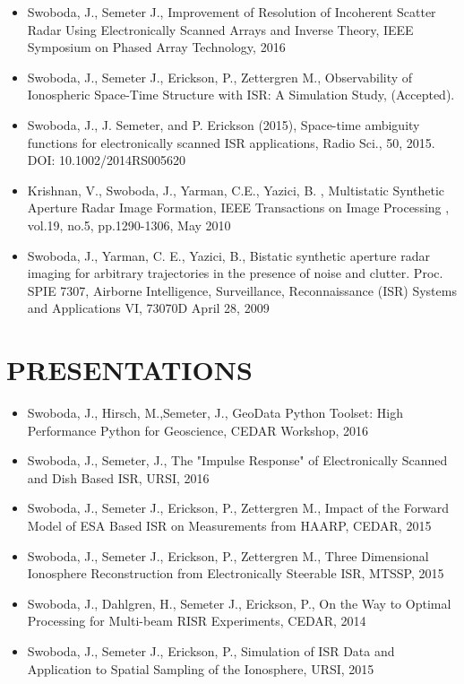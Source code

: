 \begin{itemize}
	\item Swoboda, J., Semeter J., Improvement of Resolution of Incoherent Scatter Radar Using Electronically Scanned Arrays and Inverse Theory, IEEE Symposium on Phased Array Technology, 2016
	\item Swoboda, J., Semeter J., Erickson, P., Zettergren M., Observability of Ionospheric Space-Time Structure with ISR:   A Simulation Study, (Accepted). 
	\item Swoboda, J., J. Semeter, and P. Erickson (2015), Space-time ambiguity functions for electronically scanned ISR applications, Radio Sci., 50, 2015. DOI: 10.1002/2014RS005620

	\item Krishnan, V., Swoboda, J., Yarman, C.E., Yazici, B. , Multistatic Synthetic Aperture Radar Image Formation, IEEE Transactions on Image Processing , vol.19, no.5, pp.1290-1306, May 2010
    \item  Swoboda, J., Yarman, C. E., Yazici, B., Bistatic synthetic aperture radar imaging for arbitrary trajectories in the presence of noise and clutter. Proc. SPIE 7307, Airborne Intelligence, Surveillance, Reconnaissance (ISR) Systems and Applications VI, 73070D April 28, 2009 
\end{itemize}
	
\section*{PRESENTATIONS}
\begin{itemize}
	\item Swoboda, J., Hirsch, M.,Semeter, J., GeoData Python Toolset: High Performance Python for Geoscience, CEDAR Workshop, 2016
    \item Swoboda, J.,  Semeter, J., The "Impulse Response" of Electronically Scanned and Dish Based ISR, URSI, 2016
    \item Swoboda, J., Semeter J., Erickson, P., Zettergren M., Impact of the Forward Model of ESA Based ISR on Measurements from HAARP, CEDAR, 2015
	\item Swoboda, J., Semeter J., Erickson, P., Zettergren M., Three Dimensional Ionosphere Reconstruction from Electronically Steerable ISR, MTSSP, 2015
	\item Swoboda, J., Dahlgren, H., Semeter J., Erickson, P., On the Way to Optimal Processing for Multi-beam RISR Experiments, CEDAR, 2014
    \item Swoboda, J., Semeter J., Erickson, P., Simulation of ISR Data and Application to Spatial Sampling of the Ionosphere, URSI, 2015
\end{itemize}

